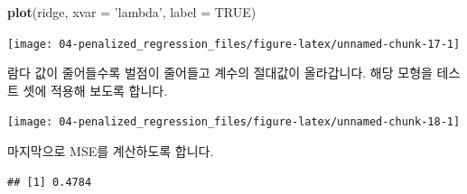 \documentclass[12pt,]{book}
\newenvironment{Shaded}{\begin{snugshade}}{\end{snugshade}}
\newcommand{\DataTypeTok}[1]{\textcolor[rgb]{0.13,0.29,0.53}{#1}}
\newcommand{\DecValTok}[1]{\textcolor[rgb]{0.00,0.00,0.81}{#1}}
\newcommand{\FloatTok}[1]{\textcolor[rgb]{0.00,0.00,0.81}{#1}}
\newcommand{\KeywordTok}[1]{\textcolor[rgb]{0.13,0.29,0.53}{\textbf{#1}}}
\newcommand{\NormalTok}[1]{#1}
\newcommand{\OperatorTok}[1]{\textcolor[rgb]{0.81,0.36,0.00}{\textbf{#1}}}
\newcommand{\OtherTok}[1]{\textcolor[rgb]{0.56,0.35,0.01}{#1}}
\newcommand{\StringTok}[1]{\textcolor[rgb]{0.31,0.60,0.02}{#1}}
\begin{document}
\begin{Shaded}
\begin{Highlighting}[]
\KeywordTok{plot}\NormalTok{(ridge, }\DataTypeTok{xvar =} \StringTok{'lambda'}\NormalTok{, }\DataTypeTok{label =} \OtherTok{TRUE}\NormalTok{)}
\end{Highlighting}
\end{Shaded}

\begin{center}\texttt{[image: 04-penalized\_regression\_files/figure-latex/unnamed-chunk-17-1]} \end{center}

람다 값이 줄어들수록 벌점이 줄어들고 계수의 절대값이 올라갑니다. 해당 모형을 테스트 셋에 적용해 보도록 합니다.

\begin{Shaded}
\end{Shaded}

\begin{center}\texttt{[image: 04-penalized\_regression\_files/figure-latex/unnamed-chunk-18-1]} \end{center}

마지막으로 MSE를 계산하도록 합니다.

\begin{Shaded}
\end{Shaded}

\begin{verbatim}
## [1] 0.4784
\end{verbatim}
\end{document}
